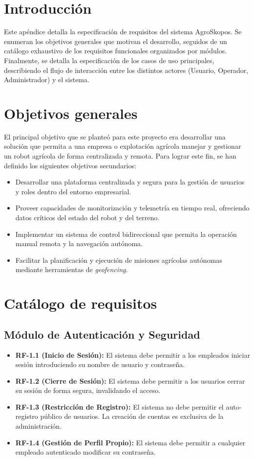 
\section{Introducción}
Este apéndice detalla la especificación de requisitos del sistema AgroSkopos. Se enumeran los objetivos generales que motivan el desarrollo, seguidos de un catálogo exhaustivo de los requisitos funcionales organizados por módulos. Finalmente, se detalla la especificación de los casos de uso principales, describiendo el flujo de interacción entre los distintos actores (Usuario, Operador, Administrador) y el sistema.

\section{Objetivos generales}
El principal objetivo que se planteó para este proyecto era desarrollar una solución que permita a una empresa o explotación agrícola manejar y gestionar un robot agrícola de forma centralizada y remota. Para lograr este fin, se han definido los siguientes objetivos secundarios:
\begin{itemize}
    \item Desarrollar una plataforma centralizada y segura para la gestión de usuarios y roles dentro del entorno empresarial.
    \item Proveer capacidades de monitorización y telemetría en tiempo real, ofreciendo datos críticos del estado del robot y del terreno.
    \item Implementar un sistema de control bidireccional que permita la operación manual remota y la navegación autónoma.
    \item Facilitar la planificación y ejecución de misiones agrícolas autónomas mediante herramientas de \textit{geofencing}.
\end{itemize}

\section{Catálogo de requisitos}

\subsection{Módulo de Autenticación y Seguridad}
\begin{itemize}
    \item \textbf{RF-1.1 (Inicio de Sesión):} El sistema debe permitir a los empleados iniciar sesión introduciendo su nombre de usuario y contraseña.
    \item \textbf{RF-1.2 (Cierre de Sesión):} El sistema debe permitir a los usuarios cerrar su sesión de forma segura, invalidando el acceso.
    \item \textbf{RF-1.3 (Restricción de Registro):} El sistema no debe permitir el auto-registro público de usuarios. La creación de cuentas es exclusiva de la administración.
    \item \textbf{RF-1.4 (Gestión de Perfil Propio):} El sistema debe permitir a cualquier empleado autenticado modificar su contraseña.
\end{itemize}

